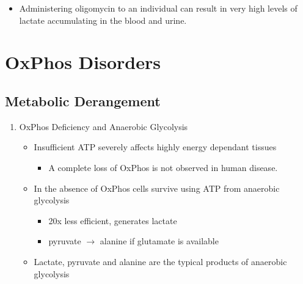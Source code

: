 \documentclass{scrartcl}
\begin{document}
\begin{enumerate}
\begin{itemize}
\item Administering oligomycin to an individual can result in very high
levels of lactate accumulating in the blood and urine.
\end{itemize}
\end{enumerate}
\section{OxPhos Disorders}
\label{sec:org5f4f2cd}
\subsection{Metabolic Derangement}
\label{sec:org475e568}
\begin{enumerate}
\item OxPhos Deficiency and Anaerobic Glycolysis
\label{sec:org818764e}
\begin{itemize}
\item Insufficient ATP severely affects highly energy dependant tissues
\begin{itemize}
\item A complete loss of OxPhos is not observed in human disease.
\end{itemize}
\item In the absence of OxPhos cells survive using ATP from anaerobic glycolysis
\begin{itemize}
\item 20x less efficient, generates lactate
\item pyruvate \(\to\) alanine if glutamate is available
\end{itemize}
\item Lactate, pyruvate and alanine are the typical products of anaerobic glycolysis
\end{itemize}


\end{enumerate}
\end{document}
